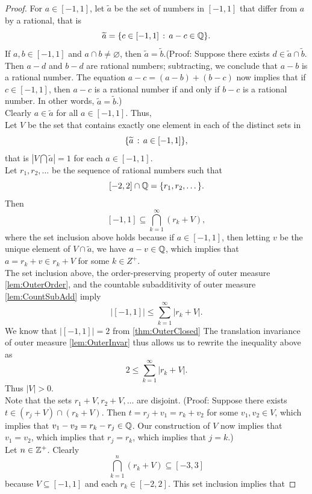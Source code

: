 \documentclass[twoside, openright, fontsize=10pt, headings=big]{scrbook}
\begin{document}
\begin{proof}
    For $a\in[-1,1]$, let $\widetilde{a}$ be the set of numbers in $[-1,1]$ that differ from $a$ by a rational, that is
    \[
        \widetilde{a}=\{c\in[-1,1]\,:\, a-c\in\mathbb{Q}\}.
    \]
    If $a,b\in[-1,1]$ and $a\cap b\neq\varnothing$, then $\widetilde{a}=\widetilde{b}$.(Proof: Suppose there exists $d \in \widetilde{a}\cap \widetilde{b}$. Then $a - d$ and $b - d$ are rational numbers; subtracting, we conclude that $a - b$ is a rational number. The equation $a - c = (a - b) + (b - c)$ now implies that if $c \in [-1, 1]$, then $a - c$ is a rational number if and only if $b - c$ is a rational number. In other words, $\widetilde{a}=\widetilde{b}$.)\\
    Clearly $a\in\widetilde{a}$ for all $a\in[-1,1]$. Thus, 
    \[ 
    \]
    Let $V$ be the set that contains exactly one element in each of the distinct sets in 
    \[
        \{\widetilde{a}\,:\, a\in[-1,1]\},
    \]
    that is $|V\bigcap \widetilde{a}|=1$ for each $a\in[-1,1]$.\\
    Let $r_1,r_2,\dots$ be the sequence of rational numbers such that 
    \[
        [-2,2]\cap\mathbb{Q}=\{r_1,r_2,\dots\}.
    \]
    Then 
    \[
        [-1,1]\subseteq\bigcap_{k=1}^{\infty}(r_k+V), 
    \]
    where the set inclusion above holds because if $a \in [-1, 1]$, then letting $v$ be the unique element of $V\cap\widetilde{a}$, we have $a - v \in \mathbb{Q}$, which implies that $a = r_k + v \in r_k + V$ for some $k \in Z^+$.\\
    The set inclusion above, the order-preserving property of outer measure \ref{lem:OuterOrder}, and the countable subadditivity of outer measure \ref{lem:CountSubAdd} imply
    \[
        |[-1,1]|\leq\sum_{k=1}^{\infty}|r_k+V|.
    \]
    We know that $|[-1,1]|=2$ from \ref{thm:OuterClosed} The translation invariance of outer measure \ref{lem:OuterInvar} thus allows us to rewrite the inequality above as
    \[
        2\leq\sum_{k=1}^{\infty}|r_k+V|.
    \]
    Thus $|V|>0$.\\
    Note that the sets $r_1 + V, r_2 + V,\dots$ are disjoint. (Proof: Suppose there exists $t \in (r_j + V) \cap (r_k + V)$. Then $t = r_j + v_1 = r_k + v_2$ for some $v_1, v_2 \in V$, which implies that $v_1 - v_2 = r_k - r_j \in\mathbb{Q}$. Our construction of $V$ now implies that $v_1 = v_2$, which implies that $r_j = r_k$, which implies that $j = k$.)\\
    Let $n\in\mathbb{Z}^+$. Clearly 
    \[
        \bigcap_{k=1}^{n}(r_k+V)\subseteq[-3,3]
    \]
    because $V\subseteq[-1,1]$ and each $r_k\in[-2,2]$. This set inclusion implies that 

\end{proof}
\end{document}
